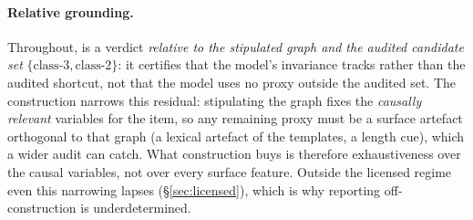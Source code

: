 \begin{table}[t]
  \centering\small
  \caption{Terminal buckets in the licensed regime. \scs{} is the
  doubly-hidden bucket: accuracy counts it \emph{and} stability endorses it.
  $^{*}$\scg{} is defined \emph{relative to the stipulated graph and the
  audited candidate-shortcut set}: an item earns the label only when
  severing every audited shortcut leaves correctness intact (\doc{}), the
  negative control is intact (\dctwo{}), the answer \emph{correctly changes}
  under a licensed intervention on the material variable \Mstr{} (class-1
  arm, \S\ref{sec:demo}.3), and predictions are non-redundant in the
  premises that license \Mstr{}. An \SC{} item that survives the sever but
  fails the class-1 or non-redundancy check is \scu{}---reported as such,
  not folded into \scg{}.}
  \label{tab:buckets}
\end{table}

\paragraph{Relative grounding.}
Throughout, \scg{} is a verdict \emph{relative to the stipulated graph and
the audited candidate set} $\{\text{class-3},\text{class-2}\}$: it
certifies that the model's invariance tracks \Mstr{} rather than the
audited shortcut, not that the model uses no proxy outside the audited
set. The construction narrows this residual: stipulating the graph fixes
the \emph{causally relevant} variables for the item, so any remaining
proxy must be a surface artefact orthogonal to that graph (a lexical
artefact of the templates, a length cue), which a wider audit can catch.
What construction buys is therefore exhaustiveness over the causal
variables, not over every surface feature. Outside the licensed regime
even this narrowing lapses (\S\ref{sec:licensed}), which is why reporting
\scg{} off-construction is underdetermined.

